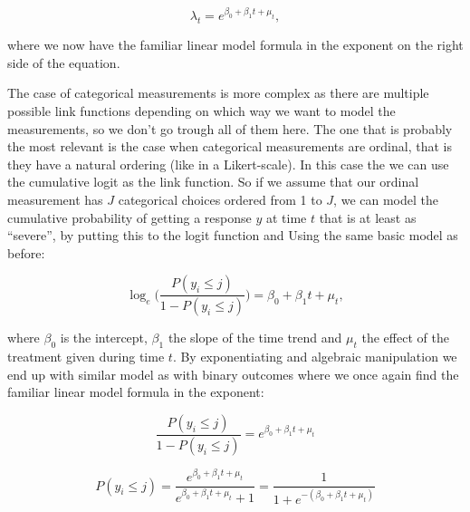 \documentclass[12pt,a4paper,leqno]{report}
\theoremstyle{plain}
\theoremstyle{definition}
\theoremstyle{remark}
\begin{document}
\begin{def}\label{oneerror}
    \begin{equation}
        \lambda_t=e^{\beta_0 + \beta_1 t + \mu_t},
    \end{equation}
\end{def}where we now have the familiar linear model formula in the exponent on the right side of
the equation.

The case of categorical measurements is more complex as there are multiple possible link functions
depending on which way we want to model the measurements, so we don't go trough all of them here.
The one that is probably the most relevant is the case when categorical measurements
are ordinal, that is they have a natural ordering (like in a Likert-scale).
In this case the we can use the cumulative logit as the link function.
So if we assume that our ordinal measurement
has \(J\) categorical choices ordered from 1 to \(J\),
we can model the cumulative probability of getting a response \(y\) at time
\(t\) that is at least as ``severe'',
by putting this to the logit function and Using the same basic model as before:

\begin{def}\label{oneerror}
    \begin{equation}
        \log_e\bigg({\frac{P(y_i \leq j)}{1 - P(y_i \leq j)}}\bigg)=\beta_0 + \beta_1 t + \mu_t,
    \end{equation}
\end{def}where \(\beta_0\) is the intercept, \(\beta_1\) the slope of the time trend and \(\mu_t\) the
effect of the treatment given during time \(t\). By exponentiating
and algebraic manipulation we end up with similar model as with binary outcomes
where we once again find the familiar linear model formula in the exponent:

\begin{def}\label{}
    \begin{equation}\label{ord_exponentiating}
        \frac{P(y_i \leq j)}{1 - P(y_i \leq j)}=e^{\beta_0 + \beta_1 t + \mu_t}
    \end{equation}
\end{def}

\begin{def}\label{}
    \begin{equation}\label{ord_algmanipulation}
        P(y_i \leq j)=\frac{e^{\beta_0 + \beta_1 t + \mu_t}}{e^{\beta_0 + \beta_1 t + \mu_t}+1}=\frac{1}{1+e^{-(\beta_0 + \beta_1 t + \mu_t)}}
    \end{equation}
\end{def}
\end{document}
